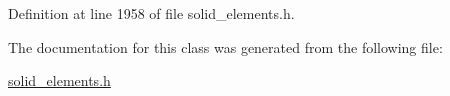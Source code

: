Definition at line 1958 of file solid\+\_\+elements.\+h.



The documentation for this class was generated from the following file\+:\begin{DoxyCompactItemize}
\item 
\hyperlink{solid__elements_8h}{solid\+\_\+elements.\+h}\end{DoxyCompactItemize}
